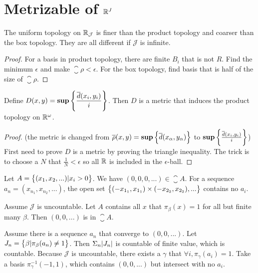 
\section{Metrizable of $\mathbb{R}^J$}


\begin{theorem}
The uniform topology on $\mathbb{R}_{\mathcal{J}}$ is finer than the product topology and coarser than the box topology. They are all different if $\mathcal{J}$ is infinite.
\end{theorem}
\begin{proof}
    For a basis in product topology, there are finite $B_i$ that is not $R$. Find the minimum $\epsilon$ and make $\closure{\rho} < \epsilon$. For the box topology, find basis that is half of the size of $\closure{\rho}$.
\end{proof}



\begin{theorem}
    Define $\displaystyle D(x,y) = \mathbf{sup} \set{\frac{\overline{d}(x_i, y_i )}{i}} $. Then $D$ is a metric that induces the product topology on $\mathbb{R}^\omega$.
\end{theorem}
\begin{proof}
    (the metric is changed from $\overline{\rho}(x,y) = \mathbf{sup} \set{ \overline{d}(x_{\alpha}, y_{\alpha})} $ to $\mathbf{sup} \set{\frac{\overline{d}(x_i, y_i )}{i}} $) First need to prove $D$ is a metric by proving the triangle inequality. The trick is to choose a $N$ that $\frac{1}{N} < \epsilon$ so all $\mathbb{R}$ is included in the $\epsilon$-ball.
\end{proof}


\begin{example}
    Let $A = \set{(x_1, x_2, ... ) | x_i > 0}$. We have $(0,0,0,...) \in \closure{A}$. For a sequence $a_n = (x_{n_1}, x_{n_2}, ...)$, the open set $\set{(- x_{1_1}, x_{1_1}) \times (- x_{2_2}, x_{2_2}), ...}$ contains no $a_i$.
\end{example}


\begin{example}
    Assume $\mathcal{J}$ is uncountable. Let $A$ contains all $x$ that $\pi_{\beta}(x) = 1$ for all but finite many $\beta$. Then $(0,0,...)$ is in $\closure{A}$.
    
    Assume there is a sequence $a_n$ that converge to $(0,0,...)$. Let $J_n = \set{\beta | \pi_\beta (a_n) \neq 1 }$. Then $\Sigma_n \abs{J_n}$ is countable of finite value, which is countable. Because $\mathcal{J}$ is uncountable, there exists a $\gamma$ that $\forall i, \pi_\gamma (a_i) = 1$. Take a basis $\pi_{\gamma}^{-1}(-1,1)$, which contains $(0,0,...)$ but intersect with no $a_i$.
\end{example}










